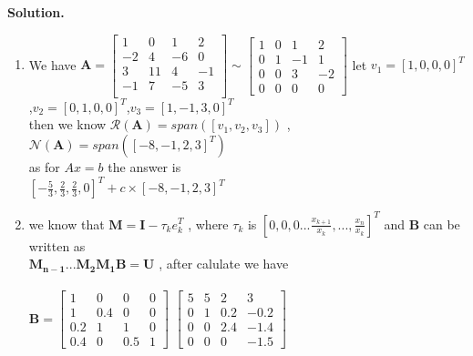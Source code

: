 \documentclass[english,onecolumn]{IEEEtran}
\begin{document}
\noindent\textbf{Solution.}
\begin{enumerate}
    \item
     We have $\mathbf{A}=\begin{bmatrix}
     1 & 0 & 1 & 2\\
     -2 & 4 & -6& 0\\
     3 & 11 & 4 & -1\\
     -1 & 7 & -5 & 3\\
     \end{bmatrix} \sim 
     \begin{bmatrix}
     1 & 0 & 1 & 2 \\
     0 &1 & -1 & 1 \\
     0 & 0 & 3 & -2 \\
     0 & 0 & 0 & 0 
     \end{bmatrix}$
     let $v_{1}=[1,0,0,0]^{T}$,$v_{2}=[0,1,0,0]^{T}$,$v_{3}=[1,-1,3,0]^{T}$\\
     then we know $\mathcal{R}(\mathbf{A})=span([v_{1},v_{2},v_{3}])$ , $\mathcal{N}(\mathbf{A})=span([-8,-1,2,3]^{T})$
     \\
     as for $Ax=b$ the answer is \\
     $[-\frac{5}{3},\frac{2}{3},\frac{2}{3},0]^{T}+c \times [-8,-1,2,3]^{T}$
     \\
     \item
     we know that $\mathbf{M}=\mathbf{I}-\tau_{k} e_{k}^{T}$ , where \(\tau_{k}\) is $[ 0,0,0...\frac{x_{k+1}}{x_{k}},...,\frac{x_{n}}{x_{k}}]^{T}$ and $\mathbf{B}$ can be written as
     \\
      $\mathbf{M_{n-1}}...\mathbf{M_{2}}\mathbf{M_{1}}\mathbf{B}=\mathbf{U}$ , after calulate we have\\\\
      $\mathbf{B}=\begin{bmatrix}
      1 & 0 & 0 & 0  \\
      1 & 0.4 & 0 & 0\\
      0.2 & 1 & 1 & 0\\
      0.4 & 0 & 0.5 & 1     
      \end{bmatrix}$ 
      $\begin{bmatrix}
      5 & 5 & 2 & 3  \\
      0 & 1 & 0.2 & -0.2\\
      0 & 0 & 2.4 & -1.4\\
      0 & 0 & 0 & -1.5     
      \end{bmatrix}$
      \\\\

\end{enumerate}
\end{document}

